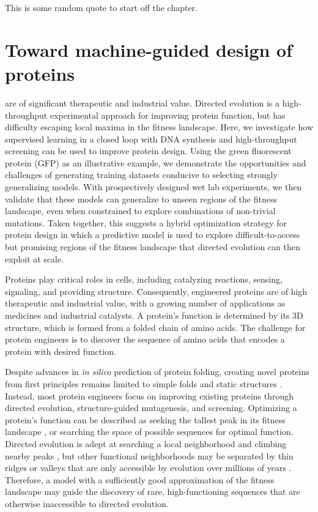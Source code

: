 

\begin{savequote}[75mm]
This is some random quote to start off the chapter.
\end{savequote}

\chapter{Toward machine-guided design of proteins}

are of significant therapeutic and industrial value. Directed evolution is a high-throughput experimental approach for improving protein function, but has difficulty escaping local maxima in the fitness landscape. Here, we investigate how supervised learning in a closed loop with DNA synthesis and high-throughput screening can be used to improve protein design. Using the green fluorescent protein (GFP) as an illustrative example, we demonstrate the opportunities and challenges of generating training datasets conducive to selecting strongly generalizing models. With prospectively designed wet lab experiments, we then validate that these models can generalize to unseen regions of the fitness landscape, even when constrained to explore combinations of non-trivial mutations. Taken together, this suggests a hybrid optimization strategy for protein design in which a predictive model is used to explore difficult-to-access but promising regions of the fitness landscape that directed evolution can then exploit at scale.

Proteins play critical roles in cells, including catalyzing reactions, sensing, signaling, and providing structure. Consequently, engineered proteins are of high therapeutic and industrial value, with a growing number of applications as medicines and industrial catalysts. A protein’s function is determined by its 3D structure, which is formed from a folded chain of amino acids. The challenge for protein engineers is to discover the sequence of amino acids that encodes a protein with desired function.

Despite advances in \textit{in silico} prediction of protein folding, creating novel proteins from first principles remains limited to simple folds and static structures \cite{Huang2016-zt}. Instead, most protein engineers focus on improving existing proteins through directed evolution, structure-guided mutagenesis, and screening. Optimizing a protein’s function can be described as seeking the tallest peak in its fitness landscape \cite{wright1932roles}, or searching the space of possible sequences for optimal function. Directed evolution is adept at searching a local neighborhood and climbing nearby peaks \cite{Romero2009-ic}, but other functional neighborhoods may be separated by thin ridges or valleys that are only accessible by evolution over millions of years \cite{pokusaeva2018experimental}. Therefore, a model with a sufficiently good approximation of the fitness landscape may guide the discovery of rare, high-functioning sequences that are otherwise inaccessible to directed evolution.

